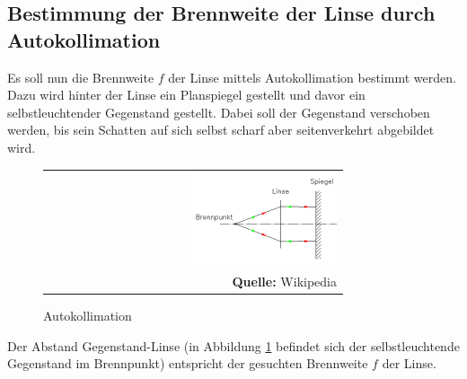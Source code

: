 \documentclass[a4paper,titlepage]{scrartcl}
\numberwithin{equation}{section}
\begin{document}
\subsection{Bestimmung der Brennweite der Linse durch Autokollimation}
Es soll nun die Brennweite $f$ der Linse mittels Autokollimation bestimmt werden. Dazu wird hinter der Linse ein Planspiegel gestellt und davor ein selbstleuchtender Gegenstand gestellt. Dabei soll der Gegenstand verschoben werden, bis sein Schatten auf sich selbst scharf aber seitenverkehrt abgebildet wird.
\begin{figure}[H]
	\centering
	\begin{tabular}{@{}r@{}}
		\includegraphics[width=0.5\textwidth]{bilder/autokollimation.png}\\
		\footnotesize\sffamily\textbf{Quelle:} Wikipedia \cite{wiki:autokollimation}
	\end{tabular}
	\caption{Autokollimation}
	\label{fig:aufgabe13}
\end{figure}
Der Abstand Gegenstand-Linse (in Abbildung \ref{fig:aufgabe13} befindet sich der selbstleuchtende Gegenstand im Brennpunkt) entspricht der gesuchten Brennweite $f$ der Linse.
\end{document}
